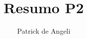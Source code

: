 \documentclass{article}
\begin{document}
\title{Resumo P2}
\author{Patrick de Angeli}
\maketitle

\tableofcontents

\newpage



\end{document}
